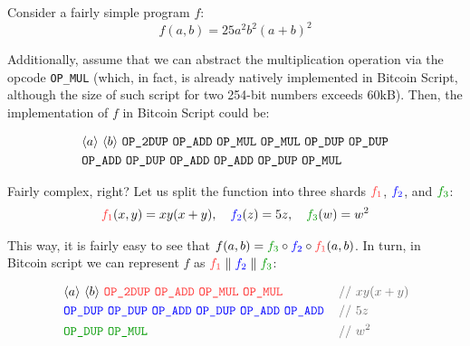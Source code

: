 \documentclass{iacrtrans}
\newcommand{\elem}[1]{\, \langle #1 \rangle \,}
\newcommand{\opcode}[1]{\, \texttt{#1} \,}
\begin{document}
\begin{example}
  Consider a fairly simple program $f$:
  \begin{equation*}
      f(a,b) = 25a^2b^2(a+b)^2
  \end{equation*}

  Additionally, assume that we can abstract the multiplication operation 
  via the opcode \texttt{OP\_MUL} (which, in fact, is already natively 
  implemented in Bitcoin Script, although the size of such script 
  for two 254-bit numbers exceeds 60kB). 
  Then, the implementation of $f$ in Bitcoin Script could be:
  \begin{empheqboxed}
    \begin{align*}
        &\elem{a} \elem{b} \opcode{\texttt{OP\_2DUP}} \opcode{\texttt{OP\_ADD}} \opcode{\texttt{OP\_MUL}} \opcode{\texttt{OP\_MUL}} 
        \opcode{\texttt{OP\_DUP}} \opcode{\texttt{OP\_DUP}} \\& \opcode{\texttt{OP\_ADD}} \opcode{\texttt{OP\_DUP}} \opcode{\texttt{OP\_ADD}} \opcode{\texttt{OP\_ADD}} \opcode{\texttt{OP\_DUP}} \opcode{\texttt{OP\_MUL}}
    \end{align*}
  \end{empheqboxed}

  Fairly complex, right? Let us split the function into three shards $\textcolor{red!80!white}{f_1}$, $\textcolor{blue}{f_2}$, and $\textcolor{green!60!black}{f_3}$:
  \begin{align*}
      \textcolor{red!80!white}{f_1}(x,y) = xy(x+y), \quad \textcolor{blue}{f_2}(z) = 5z, \quad \textcolor{green!60!black}{f_3}(w) = w^2
  \end{align*}

  This way, it is fairly easy to see that $f(a,b) = \textcolor{green!60!black}{f_3} \circ \textcolor{blue}{f_2} \circ \textcolor{red!80!white}{f_1}(a,b)$. In turn, in Bitcoin
  script we can represent $f$ as $\textcolor{red!80!white}{f_1} \parallel \textcolor{blue}{f_2} \parallel \textcolor{green!60!black}{f_3}$:
  \begin{empheqboxed}
    \begin{align*}
        &\elem{a} \elem{b} \textcolor{red!80!white}{\opcode{\texttt{OP\_2DUP}} \opcode{\texttt{OP\_ADD}} \opcode{\texttt{OP\_MUL}} \opcode{\texttt{OP\_MUL}}} && \textcolor{gray!80!black}{\text{// $xy(x+y)$}} \\
        &\textcolor{blue}{\opcode{\texttt{OP\_DUP}} \opcode{\texttt{OP\_DUP}} \opcode{\texttt{OP\_ADD}} \opcode{\texttt{OP\_DUP}} \opcode{\texttt{OP\_ADD}} \opcode{\texttt{OP\_ADD}}} && \textcolor{gray!80!black}{\text{// $5z$}} \\
        &\textcolor{green!60!black}{\opcode{\texttt{OP\_DUP}} \opcode{\texttt{OP\_MUL}}}&&\textcolor{gray!80!black}{\text{// $w^2$}}
    \end{align*}
  \end{empheqboxed}
\end{example}
\end{document}
